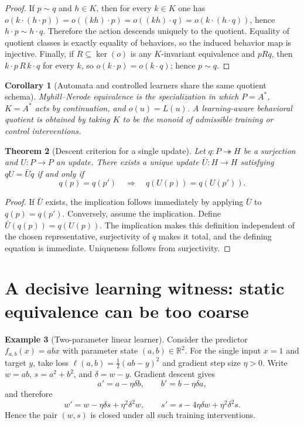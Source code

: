 \documentclass[11pt]{article}
\newtheorem{theorem}{Theorem}[section]
\newtheorem{corollary}[theorem]{Corollary}
\theoremstyle{definition}
\newtheorem{example}[theorem]{Example}
\theoremstyle{remark}
\newcommand{\onto}{\twoheadrightarrow}
\begin{document}
\begin{proof}
If $p\sim q$ and $h\in K$, then for every $k\in K$ one has $o(k\cdot(h\cdot p))=o((kh)\cdot p)=o((kh)\cdot q)=o(k\cdot(h\cdot q))$, hence $h\cdot p\sim h\cdot q$. Therefore the action descends uniquely to the quotient. Equality of quotient classes is exactly equality of behaviors, so the induced behavior map is injective. Finally, if $R\subseteq\ker(o)$ is any $K$-invariant equivalence and $pRq$, then $k\cdot p\,R\,k\cdot q$ for every $k$, so $o(k\cdot p)=o(k\cdot q)$; hence $p\sim q$.
\end{proof}

\begin{corollary}[Automata and controlled learners share the same quotient schema]
Myhill--Nerode equivalence is the specialization in which $P=A^*$, $K=A^*$ acts by continuation, and $o(u)=L(u)$. A learning-aware behavioral quotient is obtained by taking $K$ to be the monoid of admissible training or control interventions.
\end{corollary}

\begin{theorem}[Descent criterion for a single update]
Let $q:P\onto H$ be a surjection and $U:P\to P$ an update. There exists a unique update $\bar U:H\to H$ satisfying $qU=\bar U q$ if and only if
\[
q(p)=q(p')\quad\Longrightarrow\quad q(U(p))=q(U(p')).
\]
\end{theorem}

\begin{proof}
If $\bar U$ exists, the implication follows immediately by applying $\bar U$ to $q(p)=q(p')$. Conversely, assume the implication. Define $\bar U(q(p))=q(U(p))$. The implication makes this definition independent of the chosen representative, surjectivity of $q$ makes it total, and the defining equation is immediate. Uniqueness follows from surjectivity.
\end{proof}

\section{A decisive learning witness: static equivalence can be too coarse}

\begin{example}[Two-parameter linear learner]
Consider the predictor $f_{a,b}(x)=abx$ with parameter state $(a,b)\in\mathbb R^2$. For the single input $x=1$ and target $y$, take loss $\ell(a,b)=\tfrac12(ab-y)^2$ and gradient step size $\eta>0$. Write $w=ab$, $s=a^2+b^2$, and $\delta=w-y$. Gradient descent gives
\[
a'=a-\eta\delta b,\qquad b'=b-\eta\delta a,
\]
and therefore
\[
w'=w-\eta\delta s+\eta^2\delta^2w,\qquad s'=s-4\eta\delta w+\eta^2\delta^2s.
\]
Hence the pair $(w,s)$ is closed under all such training interventions.
\end{example}
\end{document}
